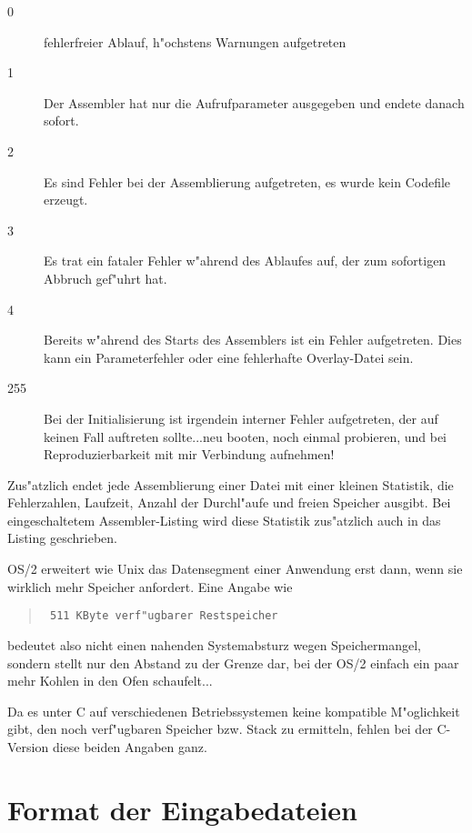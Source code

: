 \documentclass[12pt,a4paper,twoside]{report}
\begin{document}
\begin{description}
\item[0]{fehlerfreier Ablauf, h"ochstens Warnungen aufgetreten}
\item[1]{Der Assembler hat nur die Aufrufparameter ausgegeben und
         endete danach sofort.}
\item[2]{Es sind Fehler bei der Assemblierung aufgetreten, es wurde
         kein Codefile erzeugt.}
\item[3]{Es trat ein fataler Fehler w"ahrend des Ablaufes auf, der
         zum sofortigen Abbruch gef"uhrt hat.}
\item[4]{Bereits w"ahrend des Starts des Assemblers ist ein Fehler
         aufgetreten.  Dies kann ein Parameterfehler oder eine fehlerhafte
         Overlay-Datei sein.}
\item[255]{Bei der Initialisierung ist irgendein interner Fehler
         aufgetreten, der auf keinen Fall auftreten sollte...neu booten,
         noch einmal probieren, und bei Reproduzierbarkeit mit mir
         Verbindung aufnehmen!}
\end{description}

Zus"atzlich endet jede Assemblierung einer Datei mit einer kleinen
Statistik, die Fehlerzahlen, Laufzeit, Anzahl der Durchl"aufe und freien
Speicher ausgibt.  Bei eingeschaltetem Assembler-Listing wird diese
Statistik zus"atzlich auch in das Listing geschrieben.

OS/2  erweitert wie Unix das Datensegment einer
Anwendung erst dann, wenn sie wirklich mehr Speicher anfordert.  Eine
Angabe wie
\begin{quote}{\tt
511 KByte verf"ugbarer Restspeicher
}\end{quote}
bedeutet also nicht einen nahenden Systemabsturz wegen Speichermangel,
sondern stellt nur den Abstand zu der Grenze dar, bei der OS/2 einfach
ein paar mehr Kohlen in den Ofen schaufelt...

Da es unter C   auf verschiedenen Betriebssystemen
keine kompatible M"oglichkeit gibt, den noch verf"ugbaren Speicher bzw.
Stack zu ermitteln, fehlen bei der C-Version diese beiden Angaben ganz.


\section{Format der Eingabedateien}
\label{AttrTypes}
\end{document}
